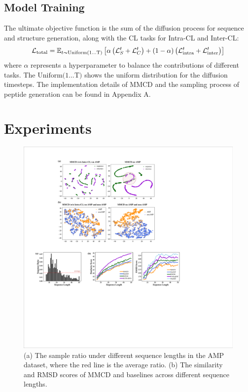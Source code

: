 \documentclass[letterpaper]{article}
\begin{document}
\subsection{Model Training}
The ultimate objective function is the sum of the diffusion process for sequence and structure generation, along with the CL tasks for Intra-CL and Inter-CL:
{\small
\begin{equation}
\mathcal{L}_\text{total}=\mathbb{E}_{t\thicksim \text{Uniform(1...T)}}\left[\alpha\left(\mathcal{L}_S^t+\mathcal{L}_C^t\right)+\left(1-\alpha\right)\left(\mathcal{L}_\text{intra}^t+\mathcal{L}_\text{inter}^t\right)\right]
\end{equation}
}where $\alpha$ represents a hyperparameter to balance the contributions of different tasks. The $\text{Uniform(1...T)}$ shows the uniform distribution for the diffusion timesteps. The implementation details of MMCD and the sampling process of peptide generation can be found in Appendix A.

\section{Experiments}
\begin{figure}[ht]
\centering
\includegraphics[scale=0.4]{fig2.pdf}
\caption{(a) The sample ratio under different sequence lengths in the AMP dataset, where the red line is the average ratio. (b) The similarity and RMSD scores of MMCD and baselines across different sequence lengths.}
\end{figure}
\end{document}
